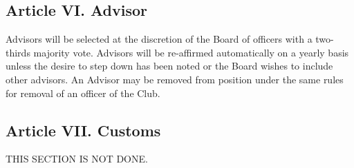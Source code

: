 \documentclass{article}
\begin{document}
  \subsection{Article VI. Advisor}
    Advisors will be selected at the discretion of the Board of officers with a two-thirds majority vote. Advisors will be re-affirmed automatically on a yearly basis unless the desire to step down has been noted or the Board wishes to include other advisors. An Advisor may be removed from position under the same rules for removal of an officer of the Club.

  \subsection{Article VII. Customs}
    THIS SECTION IS NOT DONE. 
\end{document}
